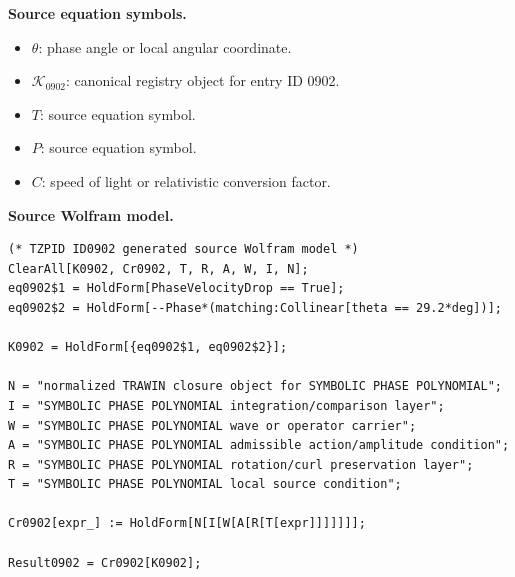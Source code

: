 \begin{minipage}[t]{0.49\linewidth}
\begingroup
\small
\raggedright
\textbf{Source equation symbols.}\par
\begin{itemize}[leftmargin=1.35em,itemsep=1pt,topsep=1pt,parsep=0pt]
    \item $\theta$: phase angle or local angular coordinate.
    \item $\mathcal{K}_{0902}$: canonical registry object for entry ID 0902.
    \item $T$: source equation symbol.
    \item $P$: source equation symbol.
    \item $C$: speed of light or relativistic conversion factor.
\end{itemize}
\endgroup
\end{minipage}\hfill
\begin{minipage}[t]{0.47\linewidth}
\begingroup
\scriptsize
\raggedright
\textbf{Source Wolfram model.}\par
\begin{Verbatim}[fontsize=\tiny,breaklines=true,breakanywhere=true]
(* TZPID ID0902 generated source Wolfram model *)
ClearAll[K0902, Cr0902, T, R, A, W, I, N];
eq0902$1 = HoldForm[PhaseVelocityDrop == True];
eq0902$2 = HoldForm[--Phase*(matching:Collinear[theta == 29.2*deg])];

K0902 = HoldForm[{eq0902$1, eq0902$2}];

N = "normalized TRAWIN closure object for SYMBOLIC PHASE POLYNOMIAL";
I = "SYMBOLIC PHASE POLYNOMIAL integration/comparison layer";
W = "SYMBOLIC PHASE POLYNOMIAL wave or operator carrier";
A = "SYMBOLIC PHASE POLYNOMIAL admissible action/amplitude condition";
R = "SYMBOLIC PHASE POLYNOMIAL rotation/curl preservation layer";
T = "SYMBOLIC PHASE POLYNOMIAL local source condition";

Cr0902[expr_] := HoldForm[N[I[W[A[R[T[expr]]]]]]];

Result0902 = Cr0902[K0902];
\end{Verbatim}
\endgroup
\end{minipage}

